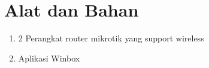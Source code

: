 \section*{Alat dan Bahan}
\indent
\begin{enumerate}
    \item 2 Perangkat router mikrotik yang support wireless
    \item Aplikasi Winbox
\end{enumerate}